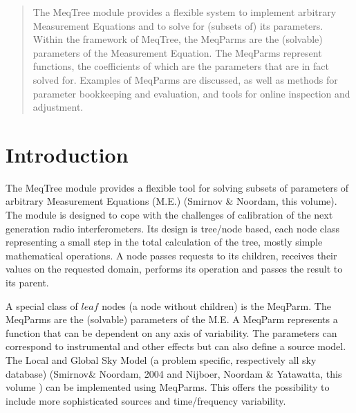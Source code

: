 \documentclass[11pt,twoside]{article}  %
\begin{document}
\begin{abstract}          %
The MeqTree module provides a flexible system to implement arbitrary
Measurement Equations and to solve for (subsets of) its parameters. Within the framework of MeqTree, the MeqParms
are the (solvable) parameters of the Measurement Equation. The
MeqParms represent functions, the coefficients of
which are the parameters that are in fact solved for.
Examples of MeqParms are discussed, as well as methods for parameter bookkeeping and evaluation, 
and tools for online inspection and adjustment.


\end{abstract}


\section{Introduction}

The MeqTree module provides a flexible tool for solving subsets of
parameters of arbitrary Measurement Equations (M.E.) (Smirnov \&
Noordam, this volume). The module is designed to cope with the
challenges of calibration of the next generation  radio
interferometers. Its design is tree/node based, each node class
representing a small step in the total calculation of the tree, mostly simple
mathematical operations. A node passes requests to its children,
receives their values on the requested domain, performs its operation
 and passes the result to its parent. 

A special class of $leaf$ nodes (a node without
children) is the MeqParm. The MeqParms are the (solvable)
parameters of the M.E. A MeqParm represents a function that can be dependent on any
axis of variability. The parameters can correspond to instrumental
and other effects but can also define a source model. The Local and Global Sky Model (a problem
specific, respectively all sky database) (Smirnov\& Noordam, 2004 and Nijboer, Noordam \&
Yatawatta, this volume ) can be implemented using  MeqParms. This 
offers the possibility to include more sophisticated sources and
time/frequency variability. 
\end{document}
